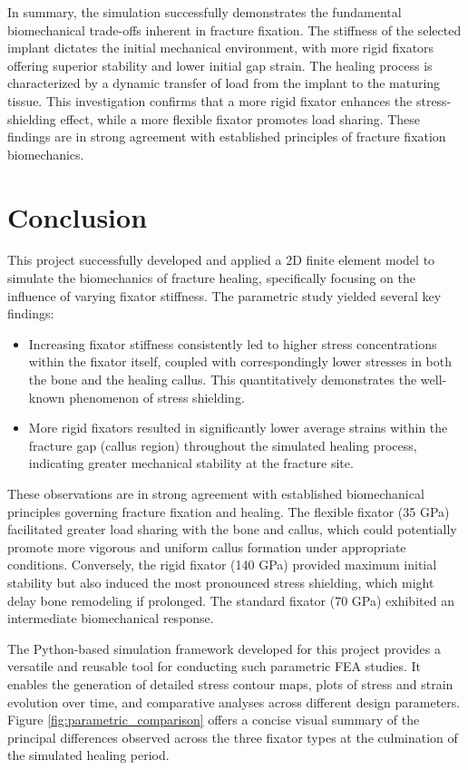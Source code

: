 \documentclass{article}
\begin{document}
In summary, the simulation successfully demonstrates the fundamental biomechanical trade-offs inherent in fracture fixation. The stiffness of the selected implant dictates the initial mechanical environment, with more rigid fixators offering superior stability and lower initial gap strain. The healing process is characterized by a dynamic transfer of load from the implant to the maturing tissue. This investigation confirms that a more rigid fixator enhances the stress-shielding effect, while a more flexible fixator promotes load sharing. These findings are in strong agreement with established principles of fracture fixation biomechanics.

\section{Conclusion}
This project successfully developed and applied a 2D finite element model to simulate the biomechanics of fracture healing, specifically focusing on the influence of varying fixator stiffness. The parametric study yielded several key findings:
\begin{itemize}
  \item Increasing fixator stiffness consistently led to higher stress concentrations within the fixator itself, coupled with correspondingly lower stresses in both the bone and the healing callus. This quantitatively demonstrates the well-known phenomenon of stress shielding.
  \item More rigid fixators resulted in significantly lower average strains within the fracture gap (callus region) throughout the simulated healing process, indicating greater mechanical stability at the fracture site.
\end{itemize}
These observations are in strong agreement with established biomechanical principles governing fracture fixation and healing. The flexible fixator (35 GPa) facilitated greater load sharing with the bone and callus, which could potentially promote more vigorous and uniform callus formation under appropriate conditions. Conversely, the rigid fixator (140 GPa) provided maximum initial stability but also induced the most pronounced stress shielding, which might delay bone remodeling if prolonged. The standard fixator (70 GPa) exhibited an intermediate biomechanical response.

The Python-based simulation framework developed for this project provides a versatile and reusable tool for conducting such parametric FEA studies. It enables the generation of detailed stress contour maps, plots of stress and strain evolution over time, and comparative analyses across different design parameters. Figure \ref{fig:parametric_comparison} offers a concise visual summary of the principal differences observed across the three fixator types at the culmination of the simulated healing period.
\end{document}
